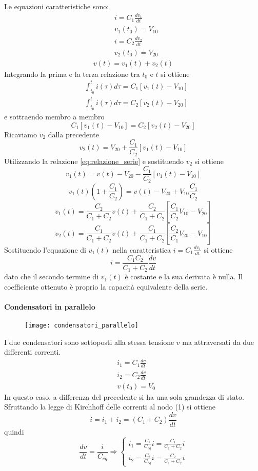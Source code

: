 Le equazioni caratteristiche sono:
\begin{align*}
&i = C_1 \frac{dv_1}{dt}\\
&v_1(t_0) = V_{10}\\
&i = C_2 \frac{dv_2}{dt} \\
&v_2(t_0) = V_{20}
\end{align*}
\begin{align}
v(t) = v_1(t) + v_2(t)
\label{eq:relazione_serie}
\end{align}
Integrando la prima e la terza relazione tra $t_0$ e $t$ si ottiene
\begin{align*}
&\int_{t_0}^t i(\tau) d\tau = C_1 \left[v_1(t) - V_{10}\right] \\
&\int_{t_0}^t i(\tau)d\tau = C_2 \left[v_2(t) - V_{20}\right]
\end{align*}
e sottraendo membro a membro
$$
C_1 \left[v_1(t) -V_{10}\right] = C_2\left[v_2(t) - V_{20}\right]
$$
Ricaviamo $v_2$ dalla precedente
$$
v_2(t) = V_{20} + \frac{C_1}{C_2} \left[v_1(t) - V_{10} \right]
$$
Utilizzando la relazione \ref{eq:relazione_serie} e sostituendo $v_2$ si ottiene
$$
v_1(t) = v(t) - V_{20} - \frac{C_1}{C_2} \left[v_1(t) - V_{10}\right]
$$
$$
v_1(t)\left(1+\frac{C_1}{C_2}\right) = v(t) - V_{20} + V_{10}\frac{C_1}{C_2}
$$
$$
v_1(t) = \frac{C_2}{C_1+C_2} v(t) + \frac{C_2}{C_1+C_2}\left[\frac{C_1}{C_2}V_{10}-V_{20}\right]
$$
$$
v_2(t) = \frac{C_1}{C_1+C_2} v(t) + \frac{C_1}{C_1+C_2}\left[\frac{C_2}{C_1}V_{20}-V_{10}\right]
$$
Sostituendo l'equazione di $v_1(t)$ nella caratteristica $i = C_1\frac{dv_1}{dt}$ si 
ottiene 
$$
i = \frac{C_1C_2}{C_1+C_2}\frac{dv}{dt}
$$
dato che il secondo termine di $v_1(t)$ è costante e la sua derivata è nulla. Il 
coefficiente ottenuto è proprio la capacità equivalente della serie.

\paragraph{Condensatori in parallelo}
\begin{figure}[H]
\centering
\texttt{[image: condensatori\_parallelo]}
\end{figure}

I due condensatori sono sottoposti alla stessa tensione $v$ ma attraversati da due
differenti correnti.
\begin{align*}
&i_1 = C_1 \frac{dv}{dt} \\
& i _2 = C_2 \frac{dv}{dt} \\
& v(t_0) = V_0
\end{align*}
In questo caso, a differenza del precedente si ha una sola grandezza di stato.
Sfruttando la legge di Kirchhoff delle correnti al nodo (1) si ottiene
$$
i = i_1 + i_2 = (C_1+C_2) \frac{dv}{dt}
$$
quindi
$$
\frac{dv}{dt} = \frac{i}{C_{eq}} \Rightarrow \begin{cases}
i_1 = \frac{C_1}{C_{eq}}i = \frac{C_1}{C_1+C_2}i\\
i_2 = \frac{C_2}{C_{eq}}i = \frac{C_2}{C_1 + C_2}i
\end{cases}
$$


